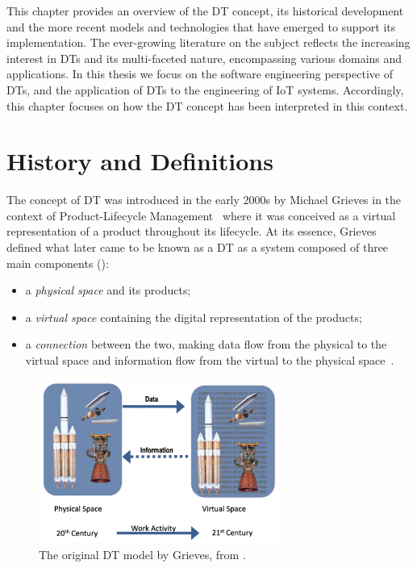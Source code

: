 This chapter provides an overview of the \ac{DT} concept,
its historical development and the more recent models and technologies that have emerged
to support its implementation.
%
The ever-growing literature on the subject reflects the increasing interest in \acp{DT}
and its multi-faceted nature, encompassing various domains and applications.
%
In this thesis we focus on the software engineering perspective of \acp{DT}, 
and the application of \acp{DT} to the engineering of \ac{IoT} systems.
%
Accordingly, this chapter focuses on how the \ac{DT} concept has been interpreted in this context.


\section{History and Definitions}

The concept of \ac{DT} was introduced in the early 2000s by Michael Grieves
in the context of Product-Lifecycle Management~\cite{Grieves_2023}
where it was conceived as a virtual representation of a product throughout its lifecycle.
%
At its essence, Grieves defined what later came to be known as a \ac{DT} as a system composed of three main components ():
\begin{itemize}
\item a \emph{physical space} and its products;
\item a \emph{virtual space} containing the digital representation of the products;
\item a \emph{connection} between the two, making data flow from the physical to the virtual space and information flow from the virtual to the physical space~\cite{Grieves2017}.
\end{itemize}

\begin{figure}[ht]
    \centering
    \includegraphics[width=0.7\textwidth]{figures/dt-original.png}
    \caption{The original \ac{DT} model by Grieves, from \cite{Grieves_2022}.}
    \label{fig:dt-grieves-original}
\end{figure}

